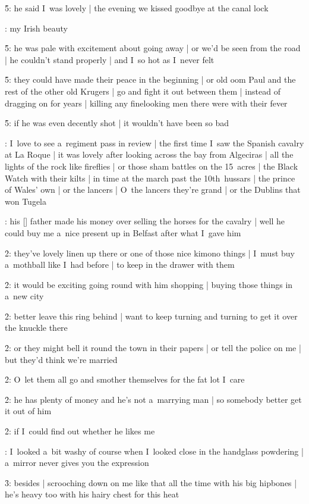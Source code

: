 \f5:
he said I~was lovely |
the evening we kissed goodbye at the canal lock

:
my Irish beauty

\f5:
he was pale with excitement about going away |
or we'd be seen from the road |
he couldn't stand properly |
and I~so hot as I~never felt

\f5:
they could have made their peace in the beginning |
or old oom Paul and the rest of the other old Krugers |
go and fight it out between them |
instead of dragging on for years |
killing any finelooking men there were with their fever

\f5:
if he was even decently shot |
it wouldn't have been so bad

:
I~love to see a~regiment pass in review |
the first time I~saw the Spanish cavalry at La Roque |
it was lovely after looking across the bay from Algeciras |
all the lights of the rock like fireflies |
or those sham battles on the 15~acres |
the Black Watch with their kilts |
in time at the march past the 10th~hussars |
the prince of Wales' own |
or the lancers |
O~the lancers they're grand |
or the Dublins that won Tugela

:
his [\boylan] father made his money over selling the horses for the cavalry |
well he could buy me a~nice present up in Belfast after what I~gave him

\f2:
they've lovely linen up there or one of those nice kimono things |
I~must buy a~mothball like I~had before |
to keep in the drawer with them

\f2:
it would be exciting going round with him shopping |
buying those things in a~new city

\f2:
better leave this ring behind |
want to keep turning and turning to get it over the knuckle there

\f2:
or they might bell it round the town in their papers |
or tell the police on me |
but they'd think we're married

\f2:
O~let them all go and smother themselves for the fat lot I~care

\f2:
he has plenty of money and he's not a~marrying man |
so somebody better get it out of him

\f2:
if I~could find out whether he likes me

:
I~looked a~bit washy of course when I~looked close in the handglass powdering |
a~mirror never gives you the expression

\f3:
besides |
scrooching down on me like that all the time with his big hipbones |
he's heavy too with his hairy chest for this heat

